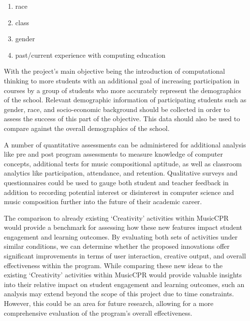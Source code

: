 \documentclass[manuscript,screen,review]{acmart}
\begin{document}
\begin{enumerate}
    \item race
    \item class
    \item gender
    \item past/current experience with computing education
\end{enumerate}





With the project's main objective being the introduction of computational thinking to more students with an additional goal of increasing participation in courses by a group of students who more accurately represent the demographics of the school. Relevant demographic information of participating students such as gender, race, and socio-economic background should be collected in order to assess the success of this part of the objective. This data should also be used to compare against the overall demographics of the school. 

A number of quantitative assessments can be administered for additional analysis like pre and post program assessments to measure knowledge of computer concepts, additional tests for music compositional aptitude, as well as classroom analytics like participation, attendance, and retention. Qualitative surveys and questionnaires could be used to gauge both student and teacher feedback in addition to recording potential interest or disinterest in computer science and music composition further into the future of their academic career. 

The comparison to already existing `Creativity' activities within MusicCPR would provide a benchmark for assessing how these new features impact student engagement and learning outcomes. By evaluating both sets of activities under similar conditions, we can determine whether the proposed innovations offer significant improvements in terms of user interaction, creative output, and overall effectiveness within the program. While comparing these new ideas to the existing `Creativity' activities within MusicCPR would provide valuable insights into their relative impact on student engagement and learning outcomes, such an analysis may extend beyond the scope of this project due to time constraints. However, this could be an area for future research, allowing for a more comprehensive evaluation of the program's overall effectiveness.
\end{document}
